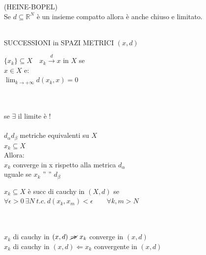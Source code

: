 \documentclass[a4paper, oneside]{article}
\begin{document}
    \begin{theorem}
        (HEINE-BOPEL)\\
        Se $d\subseteq \mathbb{R}^N$ è un insieme compatto allora è anche chiuso e limitato.
    \end{theorem}
    \hfil\\
    SUCCESSIONI in SPAZI METRICI $(x,d)$
    \begin{definition}
        $\{x_k\} \subseteq X \quad x_k \xrightarrow{d} x $ in $X$ se \\
            $x \in X$ e:\\
            $\lim_{k \to +\infty} d(x_k, x) = 0$
    \end{definition}
    \hfil\\
    \\
        se $\exists$ il limite è !\\
    \\
    $d_\alpha d_\beta$ metriche equivalenti su $X$\\
    ${x_k} \subseteq X$\\
    Allora:\\
    $x_k$ converge in x rispetto alla metrica $d_\alpha$\\
    uguale se $x_k$ '' '' $d_\beta$
    \begin{definition}
        $x_k \subseteq X$ è succ di cauchy in $(X,d)$ se\\
        $\forall \epsilon > 0 \ \exists N \ t.c. \ d(x_k, x_m) < \epsilon \qquad \forall k,m > N$
    \end{definition}
    \hfil\\
    \\
    $x_k$ di cauchy in $(x,d) \ \cancel{\Rightarrow} \ x_k$ converge in $(x,d)$\\
    $x_k$ di cauchy in $(x,d) \Leftarrow x_k$ convergente in $(x,d)$
\end{document}
